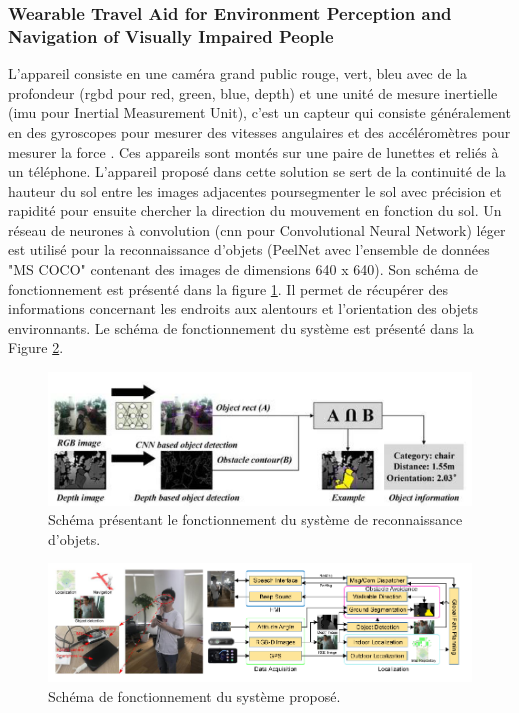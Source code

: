 \documentclass[11pt]{article}
\begin{document}
        \subsubsection{Wearable Travel Aid for Environment Perception and Navigation of Visually Impaired People}
          L'appareil consiste en une caméra grand public rouge, vert, bleu avec de la profondeur (\acrshort{rgbd} pour red, green, blue, depth)
          et une unité de mesure inertielle (\acrshort{imu} pour Inertial Measurement Unit), c'est un capteur qui consiste généralement en des gyroscopes 
          pour mesurer des vitesses angulaires et des accéléromètres pour mesurer la force \cite{baiWearableTravelAid2019}. Ces appareils sont montés sur une paire de lunettes
          et reliés à un téléphone. L'appareil proposé dans cette solution se sert de la continuité de la hauteur du sol entre les images 
          adjacentes poursegmenter le sol avec précision et rapidité pour ensuite chercher la direction du mouvement en fonction du sol.
          Un réseau de neurones à convolution (\acrshort{cnn} pour Convolutional Neural Network) léger est utilisé pour la reconnaissance d'objets 
          (PeelNet avec l'ensemble de données "MS COCO" contenant des images de dimensions 640 x 640). Son schéma de fonctionnement est présenté 
          dans la figure \ref{fig:ReconnaissanceP1}. Il permet de récupérer des informations concernant les endroits aux alentours et l'orientation 
          des objets environnants. Le schéma de fonctionnement du système est présenté dans la Figure \ref{fig:PipelineP1}.

          \begin{figure}[hbt]  
            \includegraphics[width=\textwidth]{RecognitionP1.png}    
            \caption{Schéma présentant le fonctionnement du système de reconnaissance d'objets.}
            \label{fig:ReconnaissanceP1}
          \end{figure} 

          \begin{figure}[hbt]  
            \includegraphics[width=\textwidth]{PipelineP1.png}    
            \caption{Schéma de fonctionnement du système proposé.}
            \label{fig:PipelineP1}
          \end{figure} 
\end{document}
